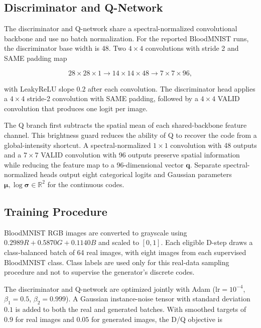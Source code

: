 \subsection{Discriminator and Q-Network}

The discriminator and Q-network share a spectral-normalized convolutional backbone and use no batch normalization. For the reported BloodMNIST runs, the discriminator base width is 48. Two $4 \times 4$ convolutions with stride 2 and SAME padding map

\begin{equation}
28 \times 28 \times 1
\rightarrow 14 \times 14 \times 48
\rightarrow 7 \times 7 \times 96,
\end{equation}

with LeakyReLU slope $0.2$ after each convolution. The discriminator head applies a $4 \times 4$ stride-2 convolution with SAME padding, followed by a $4 \times 4$ VALID convolution that produces one logit per image.

The Q branch first subtracts the spatial mean of each shared-backbone feature channel. This brightness guard reduces the ability of Q to recover the code from a global-intensity shortcut. A spectral-normalized $1 \times 1$ convolution with 48 outputs and a $7 \times 7$ VALID convolution with 96 outputs preserve spatial information while reducing the feature map to a 96-dimensional vector $\mathbf{q}$. Separate spectral-normalized heads output eight categorical logits and Gaussian parameters $\boldsymbol{\mu},\log\boldsymbol{\sigma} \in \mathbb{R}^{2}$ for the continuous codes.

\subsection{Training Procedure}

BloodMNIST RGB images are converted to grayscale using
$0.2989R+0.5870G+0.1140B$ and scaled to $[0,1]$. Each eligible D-step draws a class-balanced batch of 64 real images, with eight images from each supervised BloodMNIST class. Class labels are used only for this real-data sampling procedure and not to supervise the generator's discrete codes.

The discriminator and Q-network are optimized jointly with Adam
($\text{lr}=10^{-4}$, $\beta_1=0.5$, $\beta_2=0.999$). A Gaussian instance-noise tensor with standard deviation $0.1$ is added to both the real and generated batches. With smoothed targets of $0.9$ for real images and $0.05$ for generated images, the D/Q objective is

